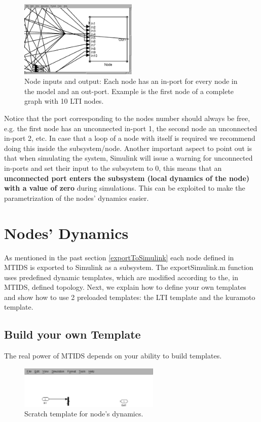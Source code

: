 \documentclass[a4paper,twoside, openright,12pt]{report}
\begin{document}
\begin{figure}[htb]
\centering
\includegraphics[width=0.5\textwidth]{pics/screenNode.eps}
\caption[MTIDS node in Simulink]{Node inputs and output: Each node has an in-port for every node in the model and an out-port. Example is the first node of a complete graph with 10 LTI nodes. }
\label{nodeFig}
\end{figure}
Notice that the port corresponding to the nodes number
should always be free, e.g. the first node has an unconnected in-port 1, the second node an unconnected in-port 2, etc. 
In case that a loop of a node with itself is required we recommend doing this inside the subsystem/node. 
Another important aspect to point out is that when simulating the system, Simulink will issue a warning for unconnected in-ports and set their input to the subsystem to 0, this means 
that an \textbf{unconnected port enters the subsystem (local dynamics of the node) with a value of zero} during simulations. This can be exploited to 
make the parametrization of the nodes' dynamics easier. 

\section{Nodes' Dynamics}

As mentioned in the past section \ref{exportToSimulink} each node defined in MTIDS is exported to Simulink as a subsystem. The exportSimulink.m function 
uses predefined dynamic templates, which are modified according to the, in MTIDS, defined topology. Next, we explain how to define your own templates and
show how to use 2 preloaded templates: the LTI template and the kuramoto template. 


\subsection{Build your own Template} \label{nodeTemplate}
The real power of MTIDS depends on your ability to build templates. 
\\
\begin{figure}[htb]
\centering
\includegraphics[width=0.6\textwidth]{pics/screenBuildTemplate.eps}
\caption[MTIDS Dynamics Template]{Scratch template for node's dynamics.}
\label{templateFig}
\end{figure}
\end{document}
